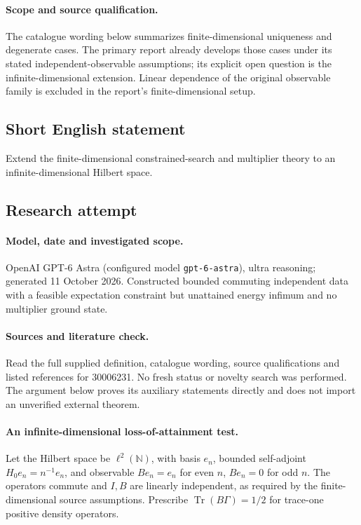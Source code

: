 \documentclass[11pt]{article}
\begin{document}
\paragraph{Scope and source qualification.}The catalogue wording below summarizes finite-dimensional uniqueness and degenerate cases. The primary report already develops those cases under its stated independent-observable assumptions; its explicit open question is the infinite-dimensional extension. Linear dependence of the original observable family is excluded in the report's finite-dimensional setup.
\subsection{Short English statement}
Extend the finite-dimensional constrained-search and multiplier theory to an infinite-dimensional Hilbert space.
\subsection{Research attempt}
\paragraph{Model, date and investigated scope.}
OpenAI GPT-6 Astra (configured model \texttt{gpt-6-astra}), ultra reasoning; generated 11 October 2026. Constructed bounded commuting independent data with a feasible expectation constraint but unattained energy infimum and no multiplier ground state.

\paragraph{Sources and literature check.}
Read the full supplied definition, catalogue wording, source qualifications and listed references for 30006231. No fresh status or novelty search was performed. The argument below proves its auxiliary statements directly and does not import an unverified external theorem.

\paragraph{An infinite-dimensional loss-of-attainment test.} Let the Hilbert space be \(\ell^2(\mathbb N)\), with basis \(e_n\), bounded self-adjoint \(H_0e_n=n^{-1}e_n\), and observable \(Be_n=e_n\) for even \(n\), \(Be_n=0\) for odd \(n\). The operators commute and \(I,B\) are linearly independent, as required by the finite-dimensional source assumptions. Prescribe \(\operatorname{Tr}(B\Gamma)=1/2\) for trace-one positive density operators.
\end{document}
